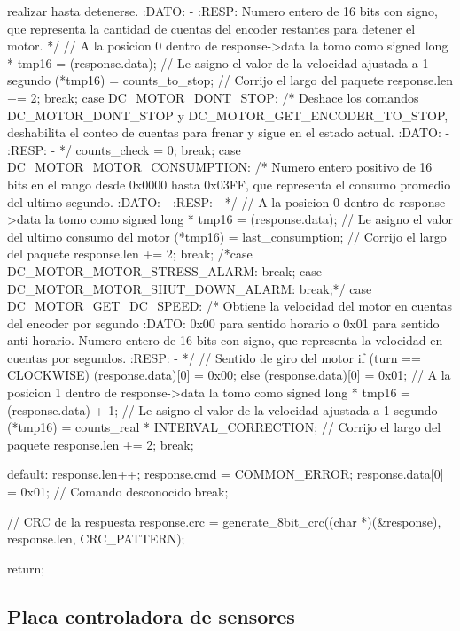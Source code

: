 {\begin{verbatimtab}
{{			realizar hasta detenerse.
			:DATO:
			-
			:RESP:
			Numero entero de 16 bits con signo, que representa la cantidad
			de cuentas del encoder restantes para detener el motor.
			*/
			// A la posicion 0 dentro de response->data la tomo como signed long *
			tmp16 = (response.data);
			// Le asigno el valor de la velocidad ajustada a 1 segundo
			(*tmp16) = counts_to_stop;
			// Corrijo el largo del paquete
			response.len += 2;
		break;
 		case DC_MOTOR_DONT_STOP:
			/* Deshace los comandos DC_MOTOR_DONT_STOP y DC_MOTOR_GET_ENCODER_TO_STOP, 
			deshabilita el conteo de cuentas para frenar y sigue en el estado actual.
			:DATO:
			-
			:RESP:
			-
			*/
			counts_check = 0;
		break;
 		case DC_MOTOR_MOTOR_CONSUMPTION:
			/* Numero entero positivo de 16 bits en el rango desde 0x0000 hasta
			0x03FF, que representa el consumo promedio del ultimo segundo.
			:DATO:
			-
			:RESP:
			-
			*/
			// A la posicion 0 dentro de response->data la tomo como signed long *
			tmp16 = (response.data);
			// Le asigno el valor del ultimo consumo del motor
			(*tmp16) = last_consumption;
			// Corrijo el largo del paquete
			response.len += 2;
		break;
 		/*case DC_MOTOR_MOTOR_STRESS_ALARM:
		break;
 		case DC_MOTOR_MOTOR_SHUT_DOWN_ALARM:
		break;*/
 		case DC_MOTOR_GET_DC_SPEED:
			/* Obtiene la velocidad del motor en cuentas del encoder por segundo
			:DATO:
			0x00 para sentido horario o 0x01 para sentido anti-horario. Numero
			entero de 16 bits con signo, que representa la velocidad en cuentas
			por segundos.
			:RESP:
			-
			*/
			// Sentido de giro del motor
			if (turn == CLOCKWISE)
			{
				(response.data)[0] = 0x00;
			} else {
				(response.data)[0] = 0x01;
			}
			// A la posicion 1 dentro de response->data la tomo como signed long *
			tmp16 = (response.data) + 1;
			// Le asigno el valor de la velocidad ajustada a 1 segundo
			(*tmp16) = counts_real * INTERVAL_CORRECTION;
			// Corrijo el largo del paquete
			response.len += 2;
		break;

		default:
			response.len++;
			response.cmd = COMMON_ERROR;
			response.data[0] = 0x01; // Comando desconocido
		break;
	}	

	// CRC de la respuesta
	response.crc = generate_8bit_crc((char *)(&response), response.len, CRC_PATTERN);

	return;
}
\end{verbatimtab}
}

\subsection{Placa controladora de sensores}
\label{hA_source_sense}

